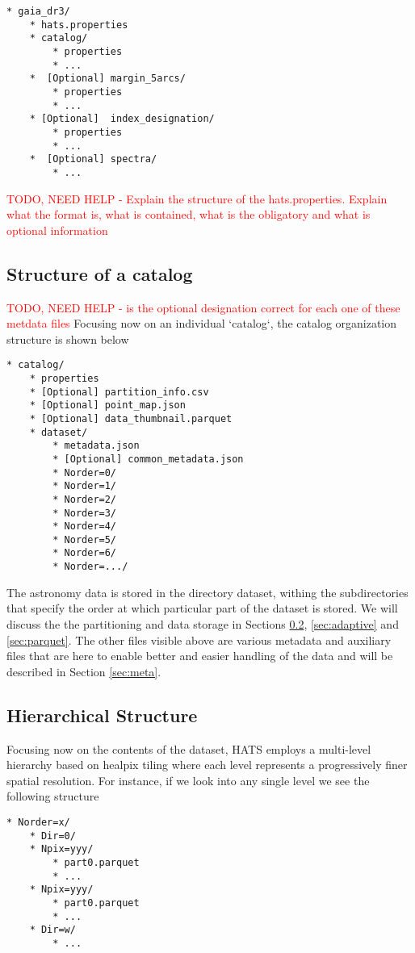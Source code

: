 \documentclass[11pt,a4paper]{ivoa}
\begin{document}
\begin{verbatim}
* gaia_dr3/
    * hats.properties
    * catalog/
        * properties
        * ...
    *  [Optional] margin_5arcs/
        * properties
        * ...
    * [Optional]  index_designation/
        * properties
        * ...
    *  [Optional] spectra/
        * ...    
\end{verbatim}    
    
\textcolor{red}{TODO, NEED HELP -  Explain the structure of the hats.properties. Explain what the format is, what is contained, what is the obligatory and what is optional information}

\subsection{Structure of a catalog} \label{sec:catalog}
\textcolor{red}{TODO, NEED HELP - is the optional designation correct for each one of these metdata files} Focusing now on an individual `catalog`, the catalog organization structure is shown below
\begin{verbatim}
* catalog/
    * properties
    * [Optional] partition_info.csv
    * [Optional] point_map.json
    * [Optional] data_thumbnail.parquet
    * dataset/
        * metadata.json
        * [Optional] common_metadata.json
        * Norder=0/
        * Norder=1/
        * Norder=2/
        * Norder=3/
        * Norder=4/
        * Norder=5/
        * Norder=6/
        * Norder=.../
\end{verbatim}

The astronomy data is stored in the directory dataset, withing the subdirectories that specify the order at which particular part of the dataset is stored. We will discuss the the partitioning and data storage in Sections \ref{sec:hierarchical}, \ref{sec:adaptive} and \ref{sec:parquet}. The other files visible above are various metadata and auxiliary files that are here to enable better and easier handling of the data and will be described in Section \ref{sec:meta}. 
    
\subsection{Hierarchical Structure} \label{sec:hierarchical}
    Focusing now on the contents of the dataset, HATS employs a multi-level hierarchy based on healpix tiling where each level represents a progressively finer spatial resolution.
For instance, if we look into any single level we see the following structure 
\begin{verbatim}
* Norder=x/
    * Dir=0/
    * Npix=yyy/
        * part0.parquet
        * ...
    * Npix=yyy/
        * part0.parquet
        * ...
    * Dir=w/
        * ...
\end{verbatim} 
\end{document}

